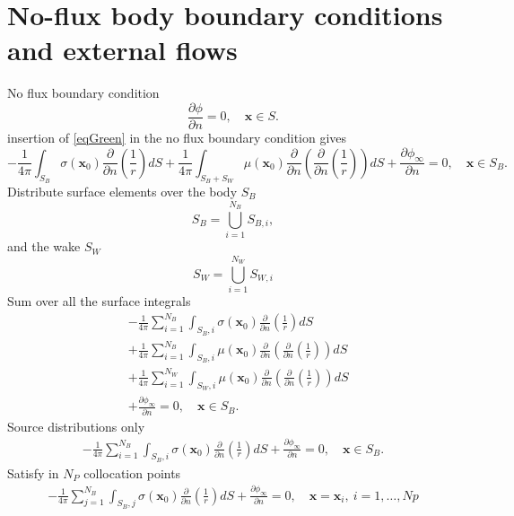 \documentclass[]{book}
\newcommand{\V}[1]{\boldsymbol{#1}}
\newcommand{\nn}{\nonumber}
\begin{document}
\section{No-flux body boundary conditions and external flows}
No flux boundary condition
\begin{equation}
\frac{\partial \phi}{\partial n} = 0, \quad \V{x} \in S.
\end{equation}
insertion of \ref{eqGreen} in the no flux boundary condition gives
\begin{equation}
 	- \frac{1}{4 \pi}  \int_{S_B} \sigma (\V{x}_0) \frac{\partial }{\partial n}\left(\frac{1}{r} \right) dS
+ \frac{1}{4 \pi} \int_{S_B + S_W} \mu(\V{x}_0) \frac{\partial }{\partial n} \left(  \frac{\partial }{\partial n} \left( \frac{1}{r}\right) \right) dS	
+ \frac{\partial \phi_{\infty} }{\partial n} = 0, \quad \V{x} \in S_B.
\end{equation}
Distribute surface elements over the body $S_B$
\begin{equation}
S_B = \bigcup_{i=1}^{N_{B}} S_{B,i},
\end{equation}
and the wake $S_W$
\begin{equation}
S_W = \bigcup_{i=1}^{N_{W}} S_{W,i}
\end{equation}
Sum over all the surface integrals
\begin{align}
&- \frac{1}{4 \pi} \sum_{i=1}^{N_B}  \int_{S_B,i} \sigma (\V{x}_0) \frac{\partial }{\partial n}\left(\frac{1}{r} \right) dS \nn \\
&+ \frac{1}{4 \pi} \sum_{i=1}^{N_B}\int_{S_B,i} \mu(\V{x}_0) \frac{\partial }{\partial n} \left(  \frac{\partial }{\partial n} \left( \frac{1}{r}\right) \right) dS \nn \\
&+ \frac{1}{4 \pi} \sum_{i=1}^{N_W}\int_{S_W,i} \mu(\V{x}_0) \frac{\partial }{\partial n} \left(  \frac{\partial }{\partial n} \left( \frac{1}{r}\right) \right) dS \nn	\\
&+ \frac{\partial \phi_{\infty} }{\partial n} = 0, \quad \V{x} \in S_B.
\end{align}
Source distributions only
\begin{align}
- \frac{1}{4 \pi} \sum_{i=1}^{N_B}  \int_{S_B,i} \sigma (\V{x}_0) \frac{\partial }{\partial n}\left(\frac{1}{r} \right) dS \nn + \frac{\partial \phi_{\infty} }{\partial n} = 0, \quad \V{x} \in S_B.
\end{align}
Satisfy in $N_P$ collocation points
\begin{align}
- \frac{1}{4 \pi} \sum_{j=1}^{N_B}  \int_{S_B,j} \sigma (\V{x}_0) \frac{\partial }{\partial n}\left(\frac{1}{r} \right) dS \nn + \frac{\partial \phi_{\infty} }{\partial n} = 0, \quad \V{x}= \V{x}_i,  ~i=1,\ldots,Np
\end{align}
	
\end{document}
